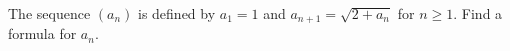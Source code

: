 The sequence $(a_n)$ is defined by $a_1=1$ and $a_{n+1}=\sqrt{2+a_n}$ for $n\ge1$. Find a formula for $a_n$.
